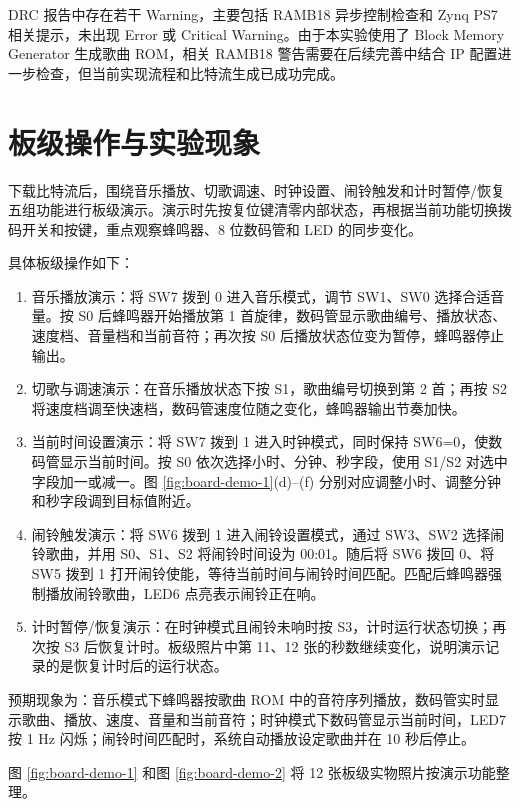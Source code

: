 \documentclass[UTF8,a4paper,12pt]{ctexart}
\begin{document}
DRC 报告中存在若干 Warning，主要包括 RAMB18 异步控制检查和 Zynq PS7 相关提示，未出现 Error 或 Critical Warning。由于本实验使用了 Block Memory Generator 生成歌曲 ROM，相关 RAMB18 警告需要在后续完善中结合 IP 配置进一步检查，但当前实现流程和比特流生成已成功完成。

\section{板级操作与实验现象}

下载比特流后，围绕音乐播放、切歌调速、时钟设置、闹铃触发和计时暂停/恢复五组功能进行板级演示。演示时先按复位键清零内部状态，再根据当前功能切换拨码开关和按键，重点观察蜂鸣器、8 位数码管和 LED 的同步变化。

具体板级操作如下：
\begin{enumerate}
  \item 音乐播放演示：将 SW7 拨到 0 进入音乐模式，调节 SW1、SW0 选择合适音量。按 S0 后蜂鸣器开始播放第 1 首旋律，数码管显示歌曲编号、播放状态、速度档、音量档和当前音符；再次按 S0 后播放状态位变为暂停，蜂鸣器停止输出。
  \item 切歌与调速演示：在音乐播放状态下按 S1，歌曲编号切换到第 2 首；再按 S2 将速度档调至快速档，数码管速度位随之变化，蜂鸣器输出节奏加快。
  \item 当前时间设置演示：将 SW7 拨到 1 进入时钟模式，同时保持 SW6=0，使数码管显示当前时间。按 S0 依次选择小时、分钟、秒字段，使用 S1/S2 对选中字段加一或减一。图 \ref{fig:board-demo-1}(d)--(f) 分别对应调整小时、调整分钟和秒字段调到目标值附近。
  \item 闹铃触发演示：将 SW6 拨到 1 进入闹铃设置模式，通过 SW3、SW2 选择闹铃歌曲，并用 S0、S1、S2 将闹铃时间设为 00:01。随后将 SW6 拨回 0、将 SW5 拨到 1 打开闹铃使能，等待当前时间与闹铃时间匹配。匹配后蜂鸣器强制播放闹铃歌曲，LED6 点亮表示闹铃正在响。
  \item 计时暂停/恢复演示：在时钟模式且闹铃未响时按 S3，计时运行状态切换；再次按 S3 后恢复计时。板级照片中第 11、12 张的秒数继续变化，说明演示记录的是恢复计时后的运行状态。
\end{enumerate}

预期现象为：音乐模式下蜂鸣器按歌曲 ROM 中的音符序列播放，数码管实时显示歌曲、播放、速度、音量和当前音符；时钟模式下数码管显示当前时间，LED7 按 1 Hz 闪烁；闹铃时间匹配时，系统自动播放设定歌曲并在 10 秒后停止。

图 \ref{fig:board-demo-1} 和图 \ref{fig:board-demo-2} 将 12 张板级实物照片按演示功能整理。
\end{document}
